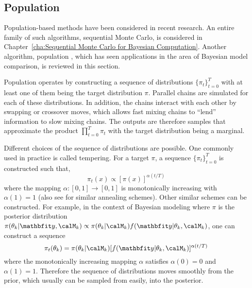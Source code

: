 \subsection{Population \protect\mcmc}
\label{sub:Population mcmc}

Population-based methods have been considered in recent research. An entire
family of such algorithms, sequential Monte Carlo, is considered in
Chapter~\ref{cha:Sequential Monte Carlo for Bayesian Computation}. Another
algorithm, population \mcmc, which has seen applications in the area of
Bayesian model comparison, is reviewed in this section.

Population \mcmc operates by constructing a sequence of distributions
$\{\pi_t\}_{t=0}^T$ with at least one of them being the target distribution
$\pi$. Parallel \mcmc chains are simulated for each of these distributions.
In addition, the chains interact with each other by swapping or crossover
moves, which allows fast mixing chains to ``lend'' information to slow mixing
chains. The outputs are therefore samples that approximate the product
$\prod_{t=0}^T\pi_t$ with the target distribution being a marginal.

Different choices of the sequence of distributions are possible. One commonly
used in practice is called tempering. For a target $\pi$, a sequence
$\{\pi_t\}_{t=0}^T$ is constructed such that,
\begin{equation}
  \pi_t(x) \propto [\pi(x)]^{\alpha(t/T)}
\end{equation}
where the mapping $\alpha:[0,1]\to[0,1]$ is monotonically increasing with
$\alpha(1) = 1$ (also see \cite{Marinari:1992vx} for similar annealing
schemes). Other similar schemes can be constructed. For example, in the
context of Bayesian modeling where $\pi$ is the posterior distribution
$\pi(\theta_k|\data,\calM_k) \propto
\pi(\theta_k|\calM_k)f(\data|\theta_k,\calM_k)$, one can construct a sequence
\begin{equation}
  \pi_t(\theta_k) =
  \pi(\theta_k|\calM_k)[f(\data|\theta_k,\calM_k)]^{\alpha(t/T)}
  \label{eq:power post}
\end{equation}
where the monotonically increasing mapping $\alpha$ satisfies $\alpha(0) = 0$
and $\alpha(1) = 1$. Therefore the sequence of distributions moves smoothly
from the prior, which usually can be sampled from easily, into the posterior.

